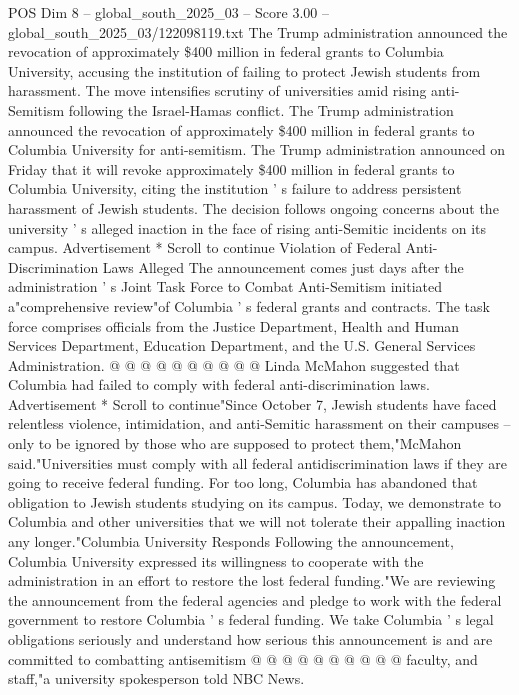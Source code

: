 \begin{textsample}{POS Dim 8 – global\_south\_2025\_03 – Score 3.00 – global\_south\_2025\_03/122098119.txt}  \label{ex:f8_pos_386}
The Trump administration announced the revocation of approximately \$400 million in federal grants to Columbia University, accusing the institution of failing to protect Jewish students from harassment.
The move intensifies scrutiny of universities amid rising anti-Semitism following the Israel-Hamas conflict.
The Trump administration announced the revocation of approximately \$400 million in federal grants to Columbia University for anti-semitism.
The Trump administration announced on Friday that it will revoke approximately \$400 million in federal grants to Columbia University, citing the institution ' s failure to address persistent harassment of Jewish students.
The decision follows ongoing concerns about the university ' s alleged inaction in the face of rising anti-Semitic incidents on its campus.
Advertisement * Scroll to continue Violation of Federal Anti-Discrimination Laws Alleged The announcement comes just days after the administration ' s Joint Task Force to Combat Anti-Semitism initiated a"comprehensive review"of Columbia ' s federal grants and contracts.
The task force comprises officials from the Justice Department, Health and Human Services Department, Education Department, and the U.S.
General Services Administration. @ @ @ @ @ @ @ @ @ @ Linda McMahon suggested that Columbia had failed to comply with federal anti-discrimination laws.
Advertisement * Scroll to continue"Since October 7, Jewish students have faced relentless violence, intimidation, and anti-Semitic harassment on their campuses -- only to be ignored by those who are supposed to protect them,"McMahon said."Universities must comply with all federal antidiscrimination laws if they are going to receive federal funding.
For too long, Columbia has abandoned that obligation to Jewish students studying on its campus.
Today, we demonstrate to Columbia and other universities that we will not tolerate their appalling inaction any longer."Columbia University Responds Following the announcement, Columbia University expressed its willingness to cooperate with the administration in an effort to restore the lost federal funding."We are reviewing the announcement from the federal agencies and pledge to work with the federal government to restore Columbia ' s federal funding.
We take Columbia ' s legal obligations seriously and understand how serious this announcement is and are committed to combatting antisemitism @ @ @ @ @ @ @ @ @ @ faculty, and staff,"a university spokesperson told NBC News.

\end{textsample}
